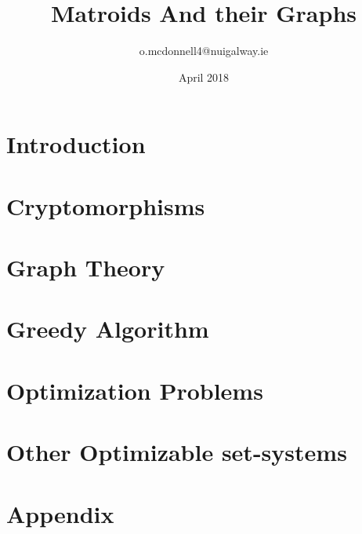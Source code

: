 \documentclass{article}
\title{Matroids And their Graphs}
\author{o.mcdonnell4@nuigalway.ie }
\date{April 2018}
\theoremstyle{plain}
\theoremstyle{definition}
\theoremstyle{remark}
\begin{document}
 
\maketitle
 


\section{Introduction}





\section{Cryptomorphisms}





\section{Graph Theory}


\section{Greedy Algorithm}


\section{Optimization Problems}





\section{Other Optimizable set-systems}


\section{Appendix}



\end{document}
